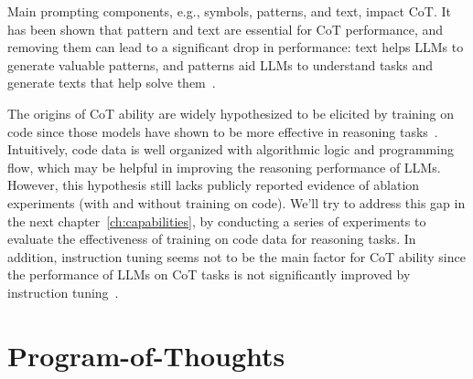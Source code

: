 Main prompting components, e.g., symbols, patterns, and text, impact CoT\@.
It has been shown that pattern and text are essential for CoT performance, and removing them can lead to a significant drop in performance: text helps LLMs to generate valuable patterns, and patterns aid LLMs to understand tasks and generate texts that help solve them~\cite{madaan2022text}.

The origins of CoT ability are widely hypothesized to be elicited by training on code since those models have shown to be more effective in reasoning tasks~\cite{fu2022gptroadmap, liang2022holistic}.
Intuitively, code data is well organized with algorithmic logic and programming flow, which may be helpful in improving the reasoning performance of LLMs. However, this hypothesis still lacks publicly reported evidence of ablation experiments (with and without training on code).
We'll try to address this gap in the next chapter~\ref{ch:capabilities}, by conducting a series of experiments to evaluate the effectiveness of training on code data for reasoning tasks.
In addition, instruction tuning seems not to be the main factor for CoT ability since the performance of LLMs on CoT tasks is not significantly improved by instruction tuning~\cite{chung2022scaling}.

\section{Program-of-Thoughts}
\label{sec:program-of-thoughts}

